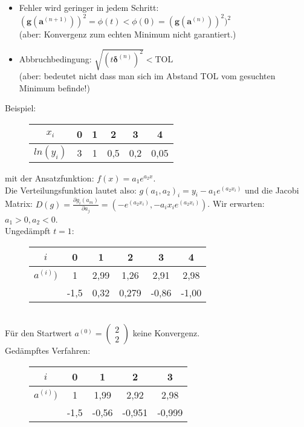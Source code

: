 \documentclass{scrartcl}
\begin{document}
\begin{itemize}
\item Fehler wird geringer in jedem Schritt: $(\boldsymbol{g}(\boldsymbol{a}^{(n+1)}))^2=\phi(t)<\phi(0)=(\boldsymbol{g}(\boldsymbol{a}^{(n)}))^2)^2$\\
(aber: Konvergenz zum echten Minimum nicht garantiert.)
\item Abbruchbedingung: $\sqrt{(t \boldsymbol{\delta}^{(n)})^2} < \text{TOL}$\\
(aber: bedeutet nicht dass man sich im Abstand TOL vom gesuchten Minimum befinde!)
\end{itemize} 
Beispiel: \begin{figure}[h]
\center
\begin{tabular}{|c||c|c|c|c|c|}

$x_i$ & 0 & 1 & 2 & 3 & 4 \\ 
\hline 
$ln(y_i)$ & 3 & 1 & 0,5 & 0,2 &0,05\\ 

\end{tabular}
\end{figure}
mit der Ansatzfunktion: $f(x)= a_1 e^{a_2 x}$.\\
Die Verteilungsfunktion lautet also: $g(a_1,a_2)_i=y_i-a_1 e^{(a_2 x_i)}$ und die Jacobi Matrix: $D(g)= \frac{\partial g_i(a_m)}{\partial a_j}=(-e^{(a_2 x_i)}, -a_i x_i e^{(a_2 x_i)})$. Wir erwarten: $a_1>0, a_2<0$.\\
Ungedämpft $t=1$:\\
\begin{figure}[h]
\center
\begin{tabular}{|c||c|c|c|c|c|}

$i$ & 0 & 1 & 2 & 3 & 4 \\ 
\hline 
$a^{(i)})$ & 1 & 2,99 & 1,26 & 2,91 &2,98\\  
 & -1,5 & 0,32 & 0,279 & -0,86 &-1,00\\ 

\end{tabular}
\end{figure}\\
Für den Startwert $a^{(0)} = \begin{pmatrix}
2 \\
2
\end{pmatrix}$ keine Konvergenz. \\
Gedämpftes Verfahren: \\
\begin{figure}[h]
\center
\begin{tabular}{|c||c|c|c|c|}

$i$ & 0 & 1 & 2 & 3\\ 
\hline 
$a^{(i)})$ & 1 & 1,99 & 2,92 & 2,98\\  
 & -1,5 & -0,56 & -0,951 & -0,999\\ 

\end{tabular}
\end{figure}
\end{document}
